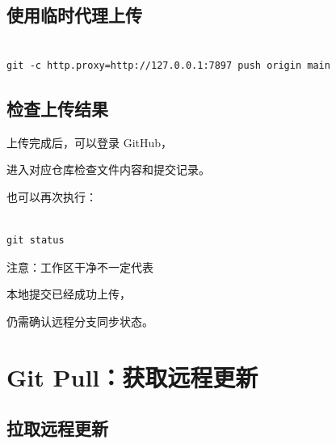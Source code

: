 \subsection{使用临时代理上传}



\begin{lstlisting}

git -c http.proxy=http://127.0.0.1:7897 push origin main

\end{lstlisting}








\subsection{检查上传结果}



上传完成后，可以登录 GitHub，

进入对应仓库检查文件内容和提交记录。



也可以再次执行：



\begin{lstlisting}

git status

\end{lstlisting}



注意：工作区干净不一定代表

本地提交已经成功上传，

仍需确认远程分支同步状态。










\section{Git Pull：获取远程更新}



\subsection{拉取远程更新}



